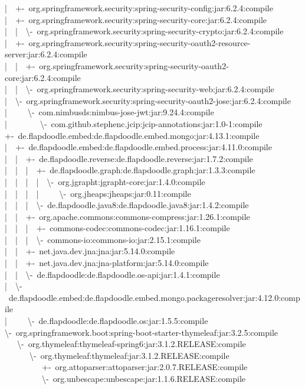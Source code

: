 |~~+-~org.springframework.security:spring-security-config:jar:6.2.4:compile\\
|~~+-~org.springframework.security:spring-security-core:jar:6.2.4:compile\\
|~~|~~\textbackslash-~org.springframework.security:spring-security-crypto:jar:6.2.4:compile\\
|~~+-~org.springframework.security:spring-security-oauth2-resource-server:jar:6.2.4:compile\\
|~~|~~+-~org.springframework.security:spring-security-oauth2-core:jar:6.2.4:compile\\
|~~|~~\textbackslash-~org.springframework.security:spring-security-web:jar:6.2.4:compile\\
|~~\textbackslash-~org.springframework.security:spring-security-oauth2-jose:jar:6.2.4:compile\\
|~~~~~\textbackslash-~com.nimbusds:nimbus-jose-jwt:jar:9.24.4:compile\\
|~~~~~~~~\textbackslash-~com.github.stephenc.jcip:jcip-annotations:jar:1.0-1:compile\\
+-~de.flapdoodle.embed:de.flapdoodle.embed.mongo:jar:4.13.1:compile\\
|~~+-~de.flapdoodle.embed:de.flapdoodle.embed.process:jar:4.11.0:compile\\
|~~|~~+-~de.flapdoodle.reverse:de.flapdoodle.reverse:jar:1.7.2:compile\\
|~~|~~|~~+-~de.flapdoodle.graph:de.flapdoodle.graph:jar:1.3.3:compile\\
|~~|~~|~~|~~\textbackslash-~org.jgrapht:jgrapht-core:jar:1.4.0:compile\\
|~~|~~|~~|~~~~~\textbackslash-~org.jheaps:jheaps:jar:0.11:compile\\
|~~|~~|~~\textbackslash-~de.flapdoodle.java8:de.flapdoodle.java8:jar:1.4.2:compile\\
|~~|~~+-~org.apache.commons:commons-compress:jar:1.26.1:compile\\
|~~|~~|~~+-~commons-codec:commons-codec:jar:1.16.1:compile\\
|~~|~~|~~\textbackslash-~commons-io:commons-io:jar:2.15.1:compile\\
|~~|~~+-~net.java.dev.jna:jna:jar:5.14.0:compile\\
|~~|~~+-~net.java.dev.jna:jna-platform:jar:5.14.0:compile\\
|~~|~~\textbackslash-~de.flapdoodle:de.flapdoodle.os-api:jar:1.4.1:compile\\
|~~\textbackslash-~de.flapdoodle.embed:de.flapdoodle.embed.mongo.packageresolver:jar:4.12.0:compile\\
|~~~~~\textbackslash-~de.flapdoodle:de.flapdoodle.os:jar:1.5.5:compile\\
\textbackslash-~org.springframework.boot:spring-boot-starter-thymeleaf:jar:3.2.5:compile\\
~~~\textbackslash-~org.thymeleaf:thymeleaf-spring6:jar:3.1.2.RELEASE:compile\\
~~~~~~\textbackslash-~org.thymeleaf:thymeleaf:jar:3.1.2.RELEASE:compile\\
~~~~~~~~~+-~org.attoparser:attoparser:jar:2.0.7.RELEASE:compile\\
~~~~~~~~~\textbackslash-~org.unbescape:unbescape:jar:1.1.6.RELEASE:compile\\